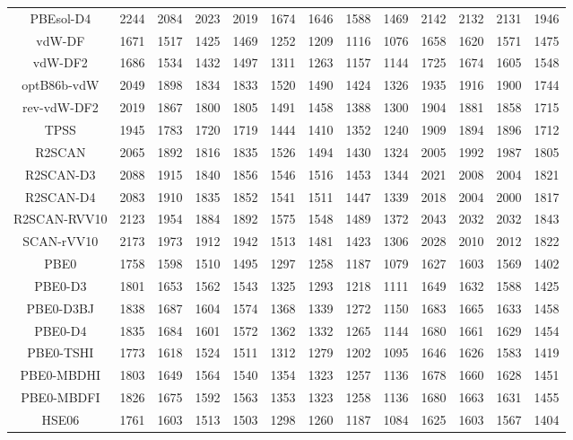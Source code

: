 \begin{table}[ht]
\begin{tabular}{ccccccccccccc}
PBEsol-D4 & 2244 & 2084 & 2023 & 2019 & 1674 & 1646 & 1588 & 1469 & 2142 & 2132 & 2131 & 1946 \\ 
vdW-DF & 1671 & 1517 & 1425 & 1469 & 1252 & 1209 & 1116 & 1076 & 1658 & 1620 & 1571 & 1475 \\ 
vdW-DF2 & 1686 & 1534 & 1432 & 1497 & 1311 & 1263 & 1157 & 1144 & 1725 & 1674 & 1605 & 1548 \\ 
optB86b-vdW & 2049 & 1898 & 1834 & 1833 & 1520 & 1490 & 1424 & 1326 & 1935 & 1916 & 1900 & 1744 \\ 
rev-vdW-DF2 & 2019 & 1867 & 1800 & 1805 & 1491 & 1458 & 1388 & 1300 & 1904 & 1881 & 1858 & 1715 \\ 
TPSS & 1945 & 1783 & 1720 & 1719 & 1444 & 1410 & 1352 & 1240 & 1909 & 1894 & 1896 & 1712 \\ 
R2SCAN & 2065 & 1892 & 1816 & 1835 & 1526 & 1494 & 1430 & 1324 & 2005 & 1992 & 1987 & 1805 \\ 
R2SCAN-D3 & 2088 & 1915 & 1840 & 1856 & 1546 & 1516 & 1453 & 1344 & 2021 & 2008 & 2004 & 1821 \\ 
R2SCAN-D4 & 2083 & 1910 & 1835 & 1852 & 1541 & 1511 & 1447 & 1339 & 2018 & 2004 & 2000 & 1817 \\ 
R2SCAN-RVV10 & 2123 & 1954 & 1884 & 1892 & 1575 & 1548 & 1489 & 1372 & 2043 & 2032 & 2032 & 1843 \\ 
SCAN-rVV10 & 2173 & 1973 & 1912 & 1942 & 1513 & 1481 & 1423 & 1306 & 2028 & 2010 & 2012 & 1822 \\ 
PBE0 & 1758 & 1598 & 1510 & 1495 & 1297 & 1258 & 1187 & 1079 & 1627 & 1603 & 1569 & 1402 \\ 
PBE0-D3 & 1801 & 1653 & 1562 & 1543 & 1325 & 1293 & 1218 & 1111 & 1649 & 1632 & 1588 & 1425 \\ 
PBE0-D3BJ & 1838 & 1687 & 1604 & 1574 & 1368 & 1339 & 1272 & 1150 & 1683 & 1665 & 1633 & 1458 \\ 
PBE0-D4 & 1835 & 1684 & 1601 & 1572 & 1362 & 1332 & 1265 & 1144 & 1680 & 1661 & 1629 & 1454 \\ 
PBE0-TSHI & 1773 & 1618 & 1524 & 1511 & 1312 & 1279 & 1202 & 1095 & 1646 & 1626 & 1583 & 1419 \\ 
PBE0-MBDHI & 1803 & 1649 & 1564 & 1540 & 1354 & 1323 & 1257 & 1136 & 1678 & 1660 & 1628 & 1451 \\ 
PBE0-MBDFI & 1826 & 1675 & 1592 & 1563 & 1353 & 1323 & 1258 & 1136 & 1680 & 1663 & 1631 & 1455 \\ 
HSE06 & 1761 & 1603 & 1513 & 1503 & 1298 & 1260 & 1187 & 1084 & 1625 & 1603 & 1567 & 1404 \\ 

\end{tabular}
\end{table}
